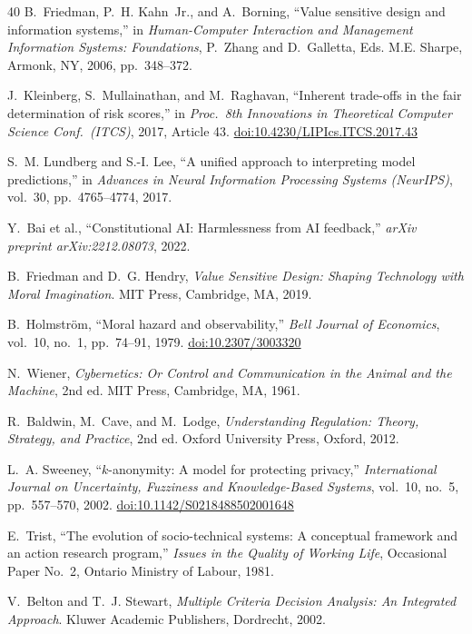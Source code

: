 \documentclass[12pt,a4paper]{article}
\newcommand{\doi}[1]{\href{https://doi.org/#1}{doi:#1}}
\theoremstyle{definition}
\theoremstyle{remark}
\begin{document}
\begin{thebibliography}{40}
B.~Friedman, P.~H. Kahn~Jr., and A.~Borning,
``Value sensitive design and information systems,''
in \emph{Human-Computer Interaction and Management Information Systems:
Foundations}, P.~Zhang and D.~Galletta, Eds.
M.E. Sharpe, Armonk, NY, 2006, pp.~348--372.

J.~Kleinberg, S.~Mullainathan, and M.~Raghavan,
``Inherent trade-offs in the fair determination of risk scores,''
in \emph{Proc.\ 8th Innovations in Theoretical Computer Science Conf.\ (ITCS)},
2017, Article 43.
\doi{10.4230/LIPIcs.ITCS.2017.43}

S.~M. Lundberg and S.-I. Lee,
``A unified approach to interpreting model predictions,''
in \emph{Advances in Neural Information Processing Systems (NeurIPS)},
vol.~30, pp.~4765--4774, 2017.

Y.~Bai et al.,
``Constitutional AI: Harmlessness from AI feedback,''
\emph{arXiv preprint arXiv:2212.08073}, 2022.

B.~Friedman and D.~G. Hendry,
\emph{Value Sensitive Design: Shaping Technology with Moral Imagination}.
MIT Press, Cambridge, MA, 2019.

B.~Holmstr{\"o}m,
``Moral hazard and observability,''
\emph{Bell Journal of Economics}, vol.~10, no.~1, pp.~74--91, 1979.
\doi{10.2307/3003320}

N.~Wiener,
\emph{Cybernetics: Or Control and Communication in the Animal and the
Machine}, 2nd ed.
MIT Press, Cambridge, MA, 1961.

R.~Baldwin, M.~Cave, and M.~Lodge,
\emph{Understanding Regulation: Theory, Strategy, and Practice}, 2nd ed.
Oxford University Press, Oxford, 2012.

L.~A. Sweeney,
``$k$-anonymity: A model for protecting privacy,''
\emph{International Journal on Uncertainty, Fuzziness and
Knowledge-Based Systems}, vol.~10, no.~5, pp.~557--570, 2002.
\doi{10.1142/S0218488502001648}

E.~Trist,
``The evolution of socio-technical systems: A conceptual framework
and an action research program,''
\emph{Issues in the Quality of Working Life}, Occasional Paper No.~2,
Ontario Ministry of Labour, 1981.

V.~Belton and T.~J. Stewart,
\emph{Multiple Criteria Decision Analysis: An Integrated Approach}.
Kluwer Academic Publishers, Dordrecht, 2002.


\end{thebibliography}
\end{document}

